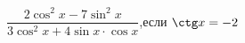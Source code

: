 \begin{ex}[type=calculate_expression]
	\begin{condition}
		\( \dfrac{2\cos^2x-7\sin^2x}{3\cos^2x+4\sin x\cdot\cos x} \),\quad если \( \ctg x = -2 \)
	\end{condition}
\end{ex}